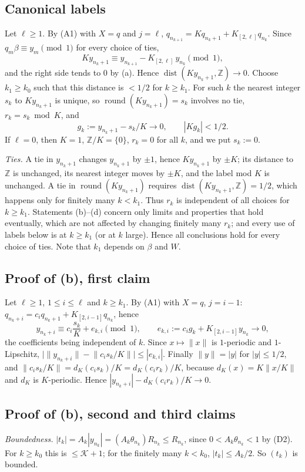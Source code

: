 \documentclass[11pt]{amsart}
\theoremstyle{definition}
\theoremstyle{remark}
\newcommand{\Z}{\mathbb{Z}}
\newcommand{\dist}[1]{\lVert #1\rVert}
\newcommand{\KL}{\mathcal{K}}
\newcommand{\rnd}{\operatorname{round}}
\newcommand{\dZ}{\operatorname{dist}}
\begin{document}
\subsection{Canonical labels}\label{subsec:labels}
Let $\ell\ge1$. By (A1) with $X=q$ and $j=\ell$, $q_{n_{k+1}}=Kq_{n_k+1}+K_{[2,\ell]}q_{n_k}$. Since
$q_m\beta\equiv y_m\pmod1$ for every choice of ties,
\[
Ky_{n_k+1}\equiv y_{n_{k+1}}-K_{[2,\ell]}\,y_{n_k}\pmod1,
\]
and the right side tends to $0$ by (a). Hence $\dZ(Ky_{n_k+1},\Z)\to0$. Choose $k_1\ge k_0$ such that this
distance is $<1/2$ for $k\ge k_1$. For such $k$ the nearest integer $s_k$ to $Ky_{n_k+1}$ is unique, so
$\rnd(Ky_{n_k+1})=s_k$ involves no tie, $r_k=s_k\bmod K$, and
\[
g_k:=y_{n_k+1}-s_k/K\to0,\qquad|Kg_k|<1/2.
\]
If $\ell=0$, then $K=1$, $\Z/K=\{0\}$, $r_k=0$ for all $k$, and we put $s_k:=0$.

\emph{Ties.} A tie in $y_{n_k+1}$ changes $y_{n_k+1}$ by $\pm1$, hence $Ky_{n_k+1}$ by $\pm K$; its distance to $\Z$ is
unchanged, its nearest integer moves by $\pm K$, and the label mod $K$ is unchanged. A tie in
$\rnd(Ky_{n_k+1})$ requires $\dZ(Ky_{n_k+1},\Z)=1/2$, which happens only for finitely many $k<k_1$. Thus $r_k$ is
independent of all choices for $k\ge k_1$. Statements (b)--(d) concern only limits and properties that hold
eventually, which are not affected by changing finitely many $r_k$; and every use of labels below is at
$k\ge k_1$ (or at $k$ large). Hence all conclusions hold for every choice of ties. Note that $k_1$ depends on $\beta$
and $W$.

\subsection{Proof of (b), first claim}
Let $\ell\ge1$, $1\le i\le\ell$ and $k\ge k_1$. By (A1) with $X=q$, $j=i-1$:
$q_{n_k+i}=c_iq_{n_k+1}+K_{[2,i-1]}q_{n_k}$, hence
\[
y_{n_k+i}\equiv c_i\frac{s_k}K+e_{k,i}\pmod1,\qquad e_{k,i}:=c_ig_k+K_{[2,i-1]}y_{n_k}\to0,
\]
the coefficients being independent of $k$. Since $x\mapsto\dist{x}$ is $1$-periodic and $1$-Lipschitz,
$\bigl|\dist{y_{n_k+i}}-\dist{c_is_k/K}\bigr|\le|e_{k,i}|$. Finally $\dist{y}=|y|$ for $|y|\le1/2$, and
$\dist{c_is_k/K}=d_K(c_is_k)/K=d_K(c_ir_k)/K$, because $d_K(x)=K\dist{x/K}$ and $d_K$ is $K$-periodic. Hence
$|y_{n_k+i}|-d_K(c_ir_k)/K\to0$.

\subsection{Proof of (b), second and third claims}
\emph{Boundedness.} $|t_k|=A_k|y_{n_k}|=(A_k\theta_{n_k})R_{n_k}\le R_{n_k}$, since $0<A_k\theta_{n_k}<1$ by (D2).
For $k\ge k_0$ this is $\le\KL+1$; for the finitely many $k<k_0$, $|t_k|\le A_k/2$. So $(t_k)$ is bounded.
\end{document}
